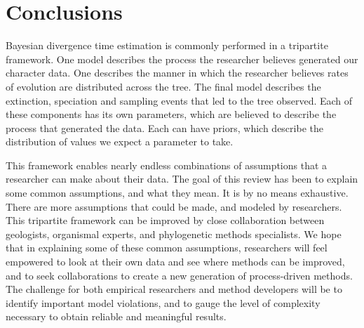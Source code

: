 \section{Conclusions}

Bayesian divergence time estimation is commonly performed in a tripartite framework.
One model describes the process the researcher believes generated our character data.
One describes the manner in which the researcher believes rates of evolution are distributed across the tree.
The final model describes the extinction, speciation and sampling events that led to the tree observed.
Each of these components has its own parameters, which are believed to describe the process that generated the data.
Each can have priors, which describe the distribution of values we expect a parameter to take.


This framework enables nearly endless combinations of assumptions that a researcher can make about their data.
The goal of this review has been to explain some common assumptions, and what they mean. 
It is by no means exhaustive.
There are more assumptions that could be made, and modeled by researchers.
This %
tripartite framework can be improved by close collaboration between geologists, organismal experts, and phylogenetic methods specialists. 
We hope that in explaining some of these common assumptions, researchers will feel empowered to look at their own data and see where methods can be improved, and to seek collaborations to create a new generation of process-driven methods. The challenge for both empirical researchers and method developers will be to identify important model violations, and to gauge the level of complexity necessary to obtain reliable and meaningful results.


